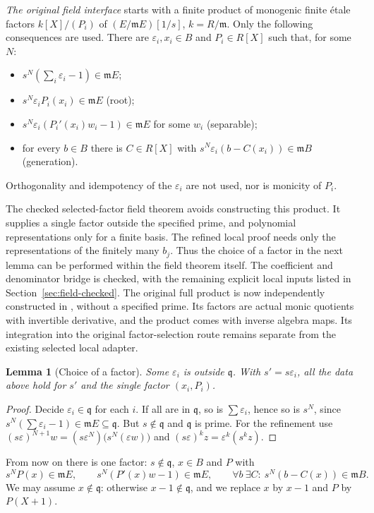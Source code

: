 \documentclass[11pt]{amsart}
\numberwithin{equation}{section}
\newtheorem{lemma}[theorem]{Lemma}
\theoremstyle{definition}
\theoremstyle{remark}
\newcommand{\m}{\mathfrak m}
\newcommand{\q}{\mathfrak q}
\begin{document}
\emph{The original field interface} \cite{LQ,L} starts with a finite
product of monogenic finite \'etale factors $k[X]/(P_i)$ of
$(E/\m E)[1/s]$, $k=R/\m$. Only the following consequences are used.
There are $\varepsilon_i,x_i\in B$ and
$P_i\in R[X]$ such that, for some $N$:
\begin{itemize}
\item $s^N(\sum_i\varepsilon_i-1)\in\m E$;
\item $s^N\varepsilon_iP_i(x_i)\in\m E$ (root);
\item $s^N\varepsilon_i(P_i'(x_i)w_i-1)\in\m E$ for some $w_i$
(separable);
\item for every $b\in B$ there is $C\in R[X]$ with
$s^N\varepsilon_i(b-C(x_i))\in\m B$ (generation).
\end{itemize}
Orthogonality and idempotency of the $\varepsilon_i$ are not used, nor
is monicity of $P_i$.

The checked selected-factor field theorem avoids constructing this product.
It supplies a single factor outside the specified prime, and polynomial
representations only for a finite basis. The refined local proof needs
only the representations of the finitely many $b_j$. Thus the choice
of a factor in the next lemma can be performed within the field theorem
itself. The coefficient and denominator bridge is checked, with the
remaining explicit local inputs listed in Section~\ref{sec:field-checked}.
The original full product is now independently constructed in
, without a specified prime. Its factors
are actual monic quotients with invertible derivative, and the product
comes with inverse algebra maps. Its integration into the original
factor-selection route remains separate from the existing selected
local adapter.

\begin{lemma}[Choice of a factor]
Some $\varepsilon_i$ is outside $\q$. With $s'=s\varepsilon_i$, all the
data above hold for $s'$ and the single factor $(x_i,P_i)$.
\end{lemma}
\begin{proof}
Decide $\varepsilon_i\in\q$ for each $i$. If all are in $\q$, so is
$\sum\varepsilon_i$, hence so is $s^N$, since
$s^N(\sum\varepsilon_i-1)\in\m E\subseteq\q$. But $s\notin\q$ and
$\q$ is prime. For the refinement use
$(s\varepsilon)^{N+1}w=(s\varepsilon^N)\bigl(s^N(\varepsilon w)\bigr)$
and $(s\varepsilon)^kz=\varepsilon^k(s^kz)$.
\end{proof}

From now on there is one factor: $s\notin\q$, $x\in B$ and $P$ with
\begin{equation}\label{eq:factor}
 s^NP(x)\in\m E,\qquad s^N(P'(x)w-1)\in\m E,\qquad
 \forall b\ \exists C:\ s^N(b-C(x))\in\m B.
\end{equation}
We may assume $x\notin\q$: otherwise $x-1\notin\q$, and we replace $x$
by $x-1$ and $P$ by $P(X+1)$.
\end{document}
